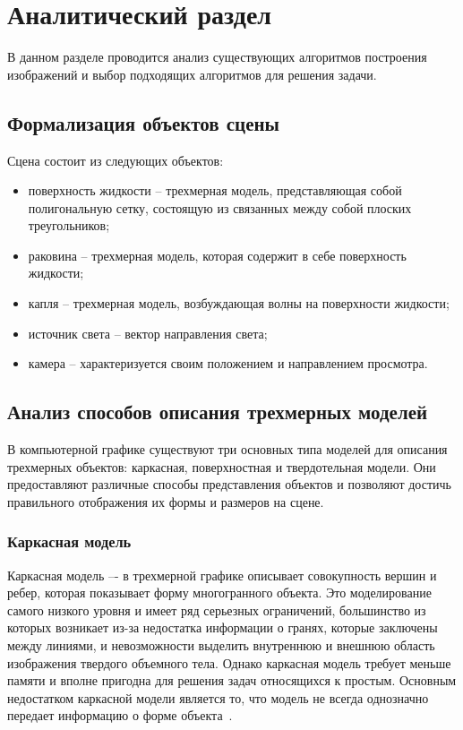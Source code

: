 \chapter{Аналитический раздел}

В данном разделе проводится анализ существующих алгоритмов построения изображений и выбор подходящих алгоритмов для решения задачи.

\section{Формализация объектов сцены}

Сцена состоит из следующих объектов:
\begin{itemize}[label*=---]
    \item поверхность жидкости -- трехмерная модель, представляющая собой полигональную сетку, состоящую из связанных между собой плоских треугольников;
    \item раковина -- трехмерная модель, которая содержит в себе поверхность жидкости;
    \item капля -- трехмерная модель, возбуждающая волны на поверхности жидкости;
    \item источник света -- вектор направления света;
    \item камера -- характеризуется своим положением и направлением просмотра.
\end{itemize}

\section{Анализ способов описания трехмерных моделей}

В компьютерной графике существуют три основных типа моделей для описания трехмерных объектов: каркасная, поверхностная и твердотельная модели. 
Они предоставляют различные способы представления объектов и позволяют 
достичь правильного отображения их формы и размеров на сцене.

\subsection{Каркасная модель}
Каркасная модель –- в трехмерной графике описывает совокупность вершин и ребер, которая показывает форму многогранного объекта. 
Это моделирование самого низкого уровня и имеет ряд серьезных ограничений, большинство из которых возникает из-за недостатка информации о гранях, которые заключены между линиями, и невозможности выделить внутреннюю и внешнюю область изображения твердого объемного тела. 
Однако каркасная модель требует меньше памяти и вполне пригодна для решения задач относящихся к простым. 
Основным недостатком каркасной модели является то, что модель не всегда однозначно передает информацию о форме объекта~\cite{MTM}.

